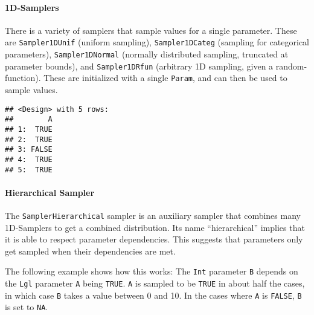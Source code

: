 \documentclass[
]{scrbook}
\newenvironment{Shaded}{\begin{snugshade}}{\end{snugshade}}
\newcommand{\DecValTok}[1]{\textcolor[rgb]{0.00,0.00,0.81}{#1}}
\newcommand{\FunctionTok}[1]{\textcolor[rgb]{0.00,0.00,0.00}{#1}}
\newcommand{\NormalTok}[1]{#1}
\newcommand{\OtherTok}[1]{\textcolor[rgb]{0.56,0.35,0.01}{#1}}
\newcommand{\SpecialCharTok}[1]{\textcolor[rgb]{0.00,0.00,0.00}{#1}}
\renewenvironment{Shaded} {\begin{snugshade}\small} {\end{snugshade}}
\begin{document}
\hypertarget{d-samplers}{%
\paragraph{1D-Samplers}\label{d-samplers}}

There is a variety of samplers that sample values for a single parameter.
These are \texttt{Sampler1DUnif} (uniform sampling), \texttt{Sampler1DCateg} (sampling for categorical parameters), \texttt{Sampler1DNormal} (normally distributed sampling, truncated at parameter bounds), and \texttt{Sampler1DRfun} (arbitrary 1D sampling, given a random-function).
These are initialized with a single \texttt{Param}, and can then be used to sample values.

\begin{Shaded}
\end{Shaded}

\begin{verbatim}
## <Design> with 5 rows:
##        A
## 1:  TRUE
## 2:  TRUE
## 3: FALSE
## 4:  TRUE
## 5:  TRUE
\end{verbatim}

\hypertarget{hierarchical-sampler}{%
\paragraph{Hierarchical Sampler}\label{hierarchical-sampler}}

The \texttt{SamplerHierarchical} sampler is an auxiliary sampler that combines many 1D-Samplers to get a combined distribution.
Its name ``hierarchical'' implies that it is able to respect parameter dependencies.
This suggests that parameters only get sampled when their dependencies are met.

The following example shows how this works: The \texttt{Int} parameter \texttt{B} depends on the \texttt{Lgl} parameter \texttt{A} being \texttt{TRUE}.
\texttt{A} is sampled to be \texttt{TRUE} in about half the cases, in which case \texttt{B} takes a value between 0 and 10.
In the cases where \texttt{A} is \texttt{FALSE}, \texttt{B} is set to \texttt{NA}.
\end{document}
